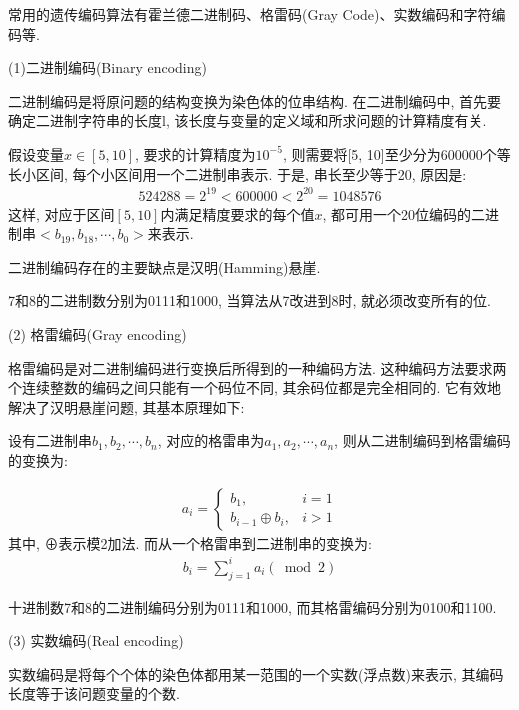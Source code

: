 {常用的遗传编码算法有霍兰德二进制码、格雷码(Gray Code)、实数编码和字符编码等.

(1)二进制编码(Binary encoding)

二进制编码是将原问题的结构变换为染色体的位串结构. 在二进制编码中, 首先要确定二进制字符串的长度l, 该长度与变量的定义域和所求问题的计算精度有关.
\begin{example}
假设变量$x\in [5,10]$, 要求的计算精度为$10^{-5}$, 则需要将[5, 10]至少分为600000个等长小区间, 每个小区间用一个二进制串表示. 于是, 串长至少等于20, 原因是:
\begin{align*}
  524288=2^{19}<600000<2^{20}=1048576
\end{align*}
这样, 对应于区间$[5,10]$内满足精度要求的每个值$x$, 都可用一个20位编码的二进制串$<b_{19},b_{18},\cdots,b_0>$来表示.
\end{example}

二进制编码存在的主要缺点是汉明(Hamming)悬崖.

\begin{example}
  7和8的二进制数分别为0111和1000, 当算法从7改进到8时, 就必须改变所有的位.
\end{example}

 (2) 格雷编码(Gray encoding)

格雷编码是对二进制编码进行变换后所得到的一种编码方法. 这种编码方法要求两个连续整数的编码之间只能有一个码位不同, 其余码位都是完全相同的. 它有效地解决了汉明悬崖问题, 其基本原理如下:

设有二进制串$b_1,b_2,\cdots,b_n$, 对应的格雷串为$a_1,a_2,\cdots,a_n$, 则从二进制编码到格雷编码的变换为:

\begin{align}
  a_{i}=\left\{\begin{array}{ll}{b_{1},} & {i=1} \\
  {b_{i-1} \oplus b_{i}}, & {i>1}\end{array}\right.
\end{align}
其中, ⊕表示模2加法. 而从一个格雷串到二进制串的变换为:
\begin{align}
  b_{i}=\sum_{j=1}^{i} a_{i}(\bmod 2)
\end{align}
\begin{example}
  十进制数7和8的二进制编码分别为0111和1000, 而其格雷编码分别为0100和1100.
\end{example}

 (3) 实数编码(Real encoding)


实数编码是将每个个体的染色体都用某一范围的一个实数(浮点数)来表示, 其编码长度等于该问题变量的个数.

}

